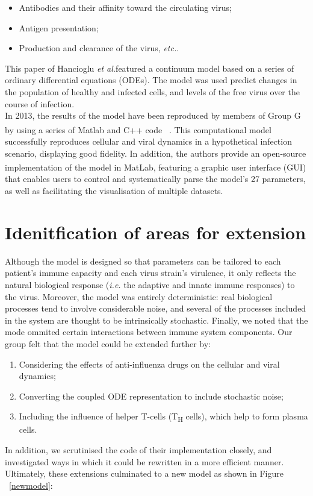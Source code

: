 \documentclass[a4paper, 12pt]{report}
\begin{document}
\begin{itemize}
\item Antibodies and their affinity toward the circulating virus;
\item Antigen presentation;
\item Production and clearance of the virus, \textit{etc.}.
\end{itemize}

This paper of Hancioglu \textit{et al.}featured a continuum model based on a series of ordinary differential equations (ODEs). The model was used predict changes in the population of healthy and infected cells, and levels of the free virus over the course of infection. \\

In 2013, the results of the model have been reproduced by members of Group G by using a series of Matlab\textsuperscript{\textregistered} and C++ code ~\cite{GroupG}. This computational model successfully reproduces cellular and viral dynamics in a hypothetical infection scenario, displaying good fidelity. In addition, the authors provide an open-source implementation of the model in MatLab\textsuperscript{\textregistered}, featuring a graphic user interface (GUI) that enables users to control and systematically parse the model's 27 parameters, as well as facilitating the visualisation of multiple datasets. \\

\section{Idenitfication of areas for extension}

Although the model is designed so that parameters can be tailored to each patient's immune capacity and each virus strain's virulence, it only reflects the natural biological response (\textit{i.e.} the adaptive and innate immune responses) to the virus. Moreover, the model was entirely deterministic: real biological processes tend to involve considerable noise, and several of the processes included in the system are thought to be intrinsically stochastic. Finally, we noted that the mode ommited certain interactions between immune system components.
Our group felt that the model could be extended further by:
\begin{enumerate}
\item Considering the effects of anti-influenza drugs on the cellular and viral dynamics;
\item Converting the coupled ODE representation to include stochastic noise;
\item Including the influence of helper T-cells (T\textsubscript{H} cells), which help to form plasma cells.
\end{enumerate}
In addition, we scrutinised the code of their implementation closely, and investigated ways in which it could be rewritten in a more efficient manner. Ultimately, these extensions culminated to a new model as shown in Figure ~\ref{newmodel}:
\end{document}
